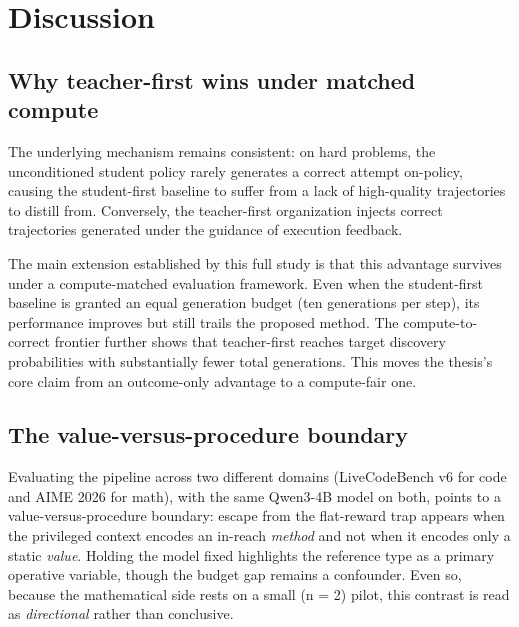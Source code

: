 \chapter{Discussion}\label{chapter-5-discussion}

\section{Why teacher-first wins under matched compute}\label{why-teacher-first-wins-now-compute-fair}

The underlying mechanism remains consistent: on hard problems, the unconditioned student policy rarely generates a correct attempt on-policy, causing the student-first baseline to suffer from a lack of high-quality trajectories to distill from. Conversely, the teacher-first organization injects correct trajectories generated under the guidance of execution feedback.

The main extension established by this full study is that this advantage survives under a compute-matched evaluation framework. Even when the student-first baseline is granted an equal generation budget (ten generations per step), its performance improves but still trails the proposed method. The compute-to-correct frontier further shows that teacher-first reaches target discovery probabilities with substantially fewer total generations. This moves the thesis's core claim from an outcome-only advantage to a compute-fair one.

\section{The value-versus-procedure boundary}\label{the-value-versus-procedure-boundary-validated}

Evaluating the pipeline across two different domains (LiveCodeBench v6 for code and AIME 2026 for math), with the same Qwen3-4B model on both, points to a value-versus-procedure boundary: escape from the flat-reward trap appears when the privileged context encodes an in-reach \emph{method} and not when it encodes only a static \emph{value}. Holding the model fixed highlights the reference type as a primary operative variable, though the budget gap remains a confounder. Even so, because the mathematical side rests on a small (n = 2) pilot, this contrast is read as \emph{directional} rather than conclusive.

